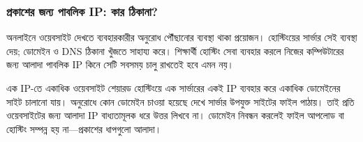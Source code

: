 \subsubsection{প্রকাশের জন্য পাবলিক IP: কার ঠিকানা?}
অনলাইনে ওয়েবসাইট দেখতে ব্যবহারকারীর অনুরোধ পৌঁছানোর ব্যবস্থা থাকা প্রয়োজন। হোস্টিংয়ের সার্ভার সেই ব্যবস্থা দেয়; ডোমেইন ও DNS ঠিকানা খুঁজতে সাহায্য করে। শিক্ষার্থী হোস্টিং সেবা ব্যবহার করলে নিজের কম্পিউটারের জন্য আলাদা পাবলিক IP কিনে সেটি সবসময় চালু রাখতেই হবে এমন নয়।

\begin{keypointbox}{এক IP-তে একাধিক ওয়েবসাইট}
শেয়ারড হোস্টিংয়ে এক সার্ভারের একই IP ব্যবহার করে একাধিক ডোমেইনের সাইট চালানো যায়। অনুরোধে কোন ডোমেইন চাওয়া হয়েছে দেখে সার্ভার উপযুক্ত সাইটের ফাইল পাঠায়। তাই প্রতি ওয়েবসাইটের জন্য আলাদা IP বাধ্যতামূলক ধরে উত্তর লিখবে না। ডোমেইন নিবন্ধন করলেই ফাইল আপলোড বা হোস্টিং সম্পন্ন হয় না—প্রকাশের ধাপগুলো আলাদা।
\end{keypointbox}
